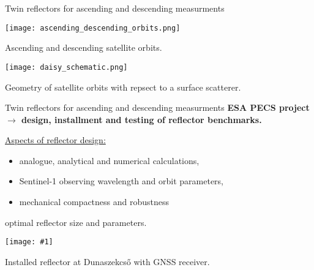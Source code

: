\documentclass[aspectratio=169]{beamer}
\newcommand{\fig}[1]{
    \begin{mdframed}[linecolor=red!50!black, linewidth=2pt, roundcorner=2.25pt,
                     innerrightmargin=0pt, innerleftmargin=0pt,
                     innertopmargin=0pt, innerbottommargin=0pt,
                     backgroundcolor=white, frametitle={}, align=center]
        \texttt{[image: \#1]}
    \end{mdframed}
}
\begin{document}
\begin{frame}{Twin reflectors for ascending and descending measurments}
    \begin{minipage}[c]{0.45\textwidth}
        \centering
        \texttt{[image: ascending\_descending\_orbits.png]}
        
        Ascending and descending satellite orbits.
    \end{minipage}
    \hspace{15pt}
    \pause
    \begin{minipage}[c]{0.45\textwidth}
        \centering
        \texttt{[image: daisy\_schematic.png]}
        
        Geometry of satellite orbits with repsect to a surface scatterer.
    \end{minipage}    
\end{frame}

\begin{frame}{Twin reflectors for ascending and descending measurments}
    \pause
    \textbf{ESA PECS project $\rightarrow$ design, installment and testing of reflector benchmarks.}
    \vspace{10pt}
    
    \begin{minipage}[c]{0.35\textwidth}
        \pause
        \underline{Aspects of reflector design:}
        \begin{itemize}
            \pause
            \item analogue, analytical and numerical calculations,
            \item Sentinel-1 observing wavelength and orbit parameters,
            \item mechanical compactness and robustness
        \end{itemize}
        \pause
        \begin{center}
            \resizebox{0.15\textwidth}{10pt}{$\Downarrow$}
            
            optimal reflector size and parameters.
        \end{center}
    \pause
    \end{minipage}
    \hspace{10pt}
    \begin{minipage}[c]{0.55\textwidth}
        \fig{dszekcso_refl_2.jpg}
        Installed reflector at Dunaszekcső with GNSS receiver.
    \end{minipage}    
\end{frame}
\end{document}
